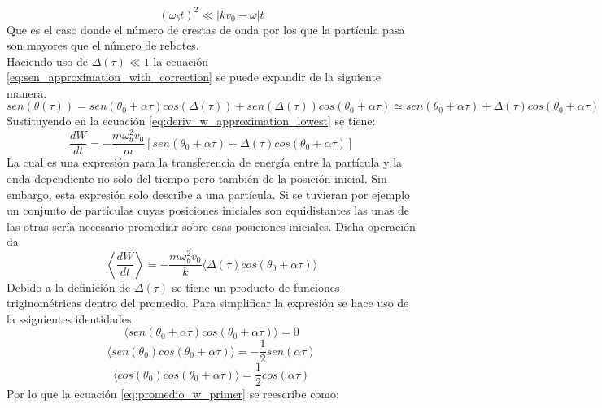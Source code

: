 \begin{equation}
\label{eq:restriccion_timepos_transferencia_ener}
(\omega_b t)^2 \ll |kv_0-\omega|t
\end{equation}
Que es el caso donde el número de crestas de onda por los que la partícula pasa son mayores que el número de rebotes.\\
Haciendo uso de $\Delta(\tau) \ll 1$ la ecuación \ref{eq:sen_approximation_with_correction} se puede expandir de la siguiente manera.
\begin{equation}
\label{eq:sen_correcion_expansion}
sen(\theta(\tau))=sen(\theta_0 + \alpha\tau)cos(\Delta(\tau))+sen(\Delta(\tau))cos(\theta_0 + \alpha\tau)\simeq sen(\theta_0 +\alpha\tau)+\Delta(\tau)cos(\theta_0 + \alpha\tau)
\end{equation}
Sustituyendo en la ecuación \ref{eq:deriv_w_approximation_lowest} se tiene:
\begin{equation}
\label{eq:deriv_w_t_correction_approximation}
\frac{dW}{dt}= -\frac{m\omega_b^2v_0}{m}[sen(\theta_0 +\alpha\tau)+\Delta(\tau)cos(\theta_0 + \alpha\tau)]
\end{equation}
La cual es una expresión para la transferencia de energía entre la partícula y la onda dependiente no solo del tiempo pero también de la posición inicial. Sin embargo, esta expresión solo describe a una partícula. Si se tuvieran por ejemplo un conjunto de partículas cuyas posiciones iniciales son equidistantes las unas de las otras sería necesario promediar sobre esas posiciones iniciales. Dicha operación da 
\begin{equation}
\label{eq:promedio_w_primer}
\left\langle \frac{dW}{dt}\right\rangle= -\frac{m\omega_b^2v_0}{k}\langle\Delta(\tau)cos(\theta_0 + \alpha\tau)\rangle
\end{equation}
Debido a la definición de $\Delta(\tau)$ se tiene un producto de funciones triginométricas dentro del promedio. Para simplificar la expresión se hace uso de la ssiguientes identidades
\begin{equation}
\langle sen(\theta_0 +\alpha\tau)cos(\theta_0 +\alpha\tau)\rangle=0
\end{equation}
\begin{equation}
\langle sen(\theta_0)cos(\theta_0 +\alpha\tau)\rangle =-\frac{1}{2}sen(\alpha\tau)
\end{equation}
\begin{equation}
\langle cos(\theta_0)cos(\theta_0 +\alpha\tau)\rangle =\frac{1}{2}cos(\alpha\tau)
\end{equation}
Por lo que la ecuación \ref{eq:promedio_w_primer} se reescribe como:
